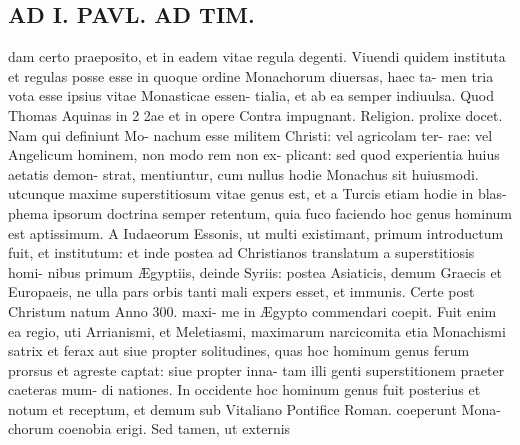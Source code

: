 \documentclass{article}
\begin{document}
\begin{pages}
\section*{AD I. PAVL. AD TIM. }
\marginpar{[ p.214 ]}dam certo praeposito, et in eadem vitae regula degenti. Viuendi quidem instituta et regulas posse esse in quoque ordine Monachorum diuersas, haec ta- men tria vota esse ipsius vitae Monasticae essen- tialia, et ab ea semper indiuulsa. Quod Thomas Aquinas in 2 2ae et in opere Contra impugnant. Religion. prolixe docet. Nam qui definiunt Mo- nachum esse militem Christi: vel agricolam ter- rae: vel Angelicum hominem, non modo rem non ex- plicant: sed quod experientia huius aetatis demon- strat, mentiuntur, cum nullus hodie Monachus sit huiusmodi. utcunque maxime superstitiosum vitae genus est, et a Turcis etiam hodie in blas- phema ipsorum doctrina semper retentum, quia fuco faciendo hoc genus hominum est aptissimum. A Iudaeorum Essonis, ut multi existimant, primum introductum fuit, et institutum: et inde postea ad Christianos translatum a superstitiosis homi- nibus primum Ægyptiis, deinde Syriis: postea Asiaticis, demum Graecis et Europaeis, ne ulla pars orbis tanti mali expers esset, et immunis. Certe post Christum natum Anno 300. maxi- me in Ægypto commendari coepit. Fuit enim ea regio, uti Arrianismi, et Meletiasmi, maximarum narcicomita etia Monachismi satrix et ferax aut siue propter solitudines, quas hoc hominum genus ferum prorsus et agreste captat: siue propter inna- tam illi genti superstitionem praeter caeteras mum- di nationes. In occidente hoc hominum genus fuit posterius et notum et receptum, et demum sub Vitaliano Pontifice Roman. coeperunt Mona- chorum coenobia erigi. Sed tamen, ut externis 

\end{pages}
\end{document}
